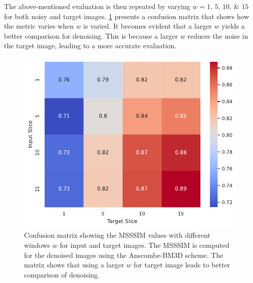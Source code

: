 The above-mentioned evaluation is then repeated by varying $w = \numlist{1;5;10;15}$ for both noisy and target images. \cref{fig:confusion_matrix_msssim_window_avg} presents a confusion matrix that shows how the metric varies when $w$ is varied. It becomes evident that a larger $w$ yields a better comparison for denoising. This is because a larger $w$ reduces the noise in the target image, leading to a more accurate evaluation.

\begin{figure}
    \centering
    \includegraphics[width=0.5\linewidth]{images/confusion_matrix_msssim_window_avg.pdf}
    \caption{Confusion matrix  showing the \gls{MSSSIM} values with different windows $w$ for input and target images. The \gls{MSSSIM} is computed for the denoised images using the Anscombe-BM3D scheme. The matrix shows that using a larger $w$ for target image leads to better comparison of denoising.}
    \label{fig:confusion_matrix_msssim_window_avg}
\end{figure}

